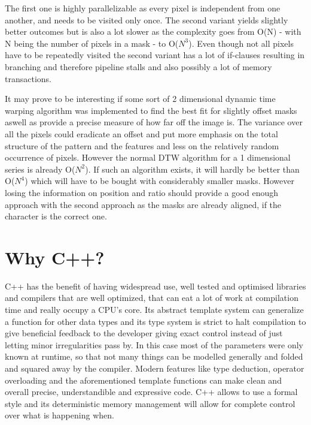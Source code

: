 \documentclass[12pt]{scrartcl}
\begin{document}
The first one is highly parallelizable as every pixel is independent from one another, and needs to be visited only once. The second variant yields slightly better outcomes but is also a lot slower as the complexity goes from O(N) - with N being the number of pixels in a mask - to O($N^3$). Even though not all pixels have to be repeatedly visited the second variant has a lot of if-clauses resulting in branching and therefore pipeline stalls and also possibly a lot of memory transactions.

It may prove to be interesting if some sort of 2 dimensional dynamic time warping algorithm was implemented to find the best fit for slightly offset masks aswell as provide a precise measure of how far off the image is. The variance over all the pixels could eradicate an offset and put more emphasis on the total structure of the pattern and the features and less on the relatively random occurrence of pixels. However the normal DTW algorithm for a 1 dimensional series is already O($N^2$). If such an algorithm exists, it will hardly be better than O($N^4$) which will have to be bought with considerably smaller masks. However losing the information on position and ratio should provide a good enough approach with the second approach as the masks are already aligned, if the character is the correct one.

\section {Why C++?}
C++ has the benefit of having widespread use, well tested and optimised libraries and compilers that are well optimized, that can eat a lot of work at compilation time and really occupy a CPU's core. Its abstract template system can generalize a function for other data types and its type system is strict to halt compilation to give beneficial feedback to the developer giving exact control instead of just letting minor irregularities pass by. In this case most of the parameters were only known at runtime, so that not many things can be modelled generally and folded and squared away by the compiler. Modern features like type deduction, operator overloading and the aforementioned template functions can make clean and overall precise, understandible and expressive code.
C++ allows to use a formal style and its deterministic memory management will allow for complete control over what is happening when. 
\end{document}
